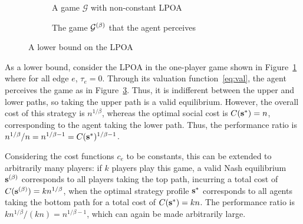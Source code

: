\documentclass[twoside]{article}
\begin{document}
\begin{multicols}{2}
\begin{figure}[H]
\begin{subfigure}[b]{\linewidth}
    \caption{A game $\mathcal{G}$ with non-constant LPOA}
    \label{fig:lower}
  \end{subfigure}

  \begin{subfigure}[b]{\linewidth}
    \centering
    \caption{The game $\mathcal{G}^{(\beta)}$ that the agent perceives}
    \label{fig:lowerbet}
  \end{subfigure}
  \caption{A lower bound on the LPOA}
\end{figure}

As a lower bound, consider the LPOA in the one-player game shown in
Figure~\ref{fig:lower} where for all edge $e$, $\tau_e = 0$. Through its valuation function~\eqref{eq:val}, the agent
perceives the game as in Figure~\ref{fig:lowerbet}. Thus, it is indifferent
between the upper and lower paths, so taking the upper path is a valid
equilibrium. However, the overall cost of this strategy is $n^{1/\beta}$,
whereas the optimal social cost is $C(\mathbf{s}^*) = n$, corresponding to the agent
taking the lower path. Thus, the performance ratio is $n^{1/\beta}/n =
n^{1/\beta-1} = C(\mathbf{s}^*)^{1/\beta-1}$.

Considering the cost functions $c_e$ to be constants, this can be extended to
arbitrarily many players: if $k$ players play this game, a valid Nash
equilibrium $\mathbf{s}^{(\beta)}$ corresponds to all players taking the top path, incurring
a total cost of $C(\mathbf{s}^{(\beta)}) = kn^{1/\beta}$, when the optimal strategy profile
$\mathbf{s}^*$ corresponds to all agents taking the bottom path for a total cost of
$C(\mathbf{s}^*) = kn$. The performance ratio is $kn^{1/\beta}/(kn) = n^{1/\beta-1}$,
which can again be made arbitrarily large.


\end{multicols}
\end{document}
